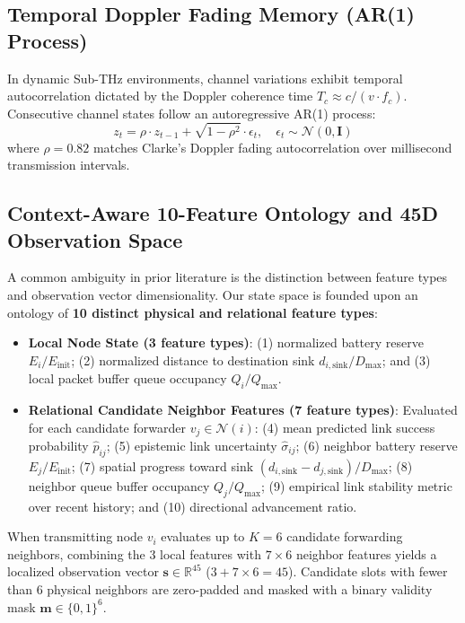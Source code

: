 \documentclass[conference]{IEEEtran}
\begin{document}
\subsection{Temporal Doppler Fading Memory (AR(1) Process)}
In dynamic Sub-THz environments, channel variations exhibit temporal autocorrelation dictated by the Doppler coherence time $T_c \approx c / (v \cdot f_c)$. Consecutive channel states follow an autoregressive AR(1) process:
\begin{equation}
z_t = \rho \cdot z_{t-1} + \sqrt{1 - \rho^2} \cdot \epsilon_t, \quad \epsilon_t \sim \mathcal{N}(0, \mathbf{I})
\end{equation}
where $\rho = 0.82$ matches Clarke's Doppler fading autocorrelation over millisecond transmission intervals.

\subsection{Context-Aware 10-Feature Ontology and 45D Observation Space}
A common ambiguity in prior literature is the distinction between feature types and observation vector dimensionality. Our state space is founded upon an ontology of \textbf{10 distinct physical and relational feature types}:
\begin{itemize}
    \item \textbf{Local Node State (3 feature types)}: (1) normalized battery reserve $E_i / E_{\text{init}}$; (2) normalized distance to destination sink $d_{i, \text{sink}} / D_{\text{max}}$; and (3) local packet buffer queue occupancy $Q_i / Q_{\text{max}}$.
    \item \textbf{Relational Candidate Neighbor Features (7 feature types)}: Evaluated for each candidate forwarder $v_j \in \mathcal{N}(i)$: (4) mean predicted link success probability $\hat{p}_{ij}$; (5) epistemic link uncertainty $\hat{\sigma}_{ij}$; (6) neighbor battery reserve $E_j / E_{\text{init}}$; (7) spatial progress toward sink $(d_{i, \text{sink}} - d_{j, \text{sink}}) / D_{\text{max}}$; (8) neighbor queue buffer occupancy $Q_j / Q_{\text{max}}$; (9) empirical link stability metric over recent history; and (10) directional advancement ratio.
\end{itemize}
When transmitting node $v_i$ evaluates up to $K = 6$ candidate forwarding neighbors, combining the $3$ local features with $7 \times 6$ neighbor features yields a localized observation vector $\mathbf{s} \in \mathbb{R}^{45}$ ($3 + 7 \times 6 = 45$). Candidate slots with fewer than 6 physical neighbors are zero-padded and masked with a binary validity mask $\mathbf{m} \in \{0, 1\}^6$.
\end{document}
